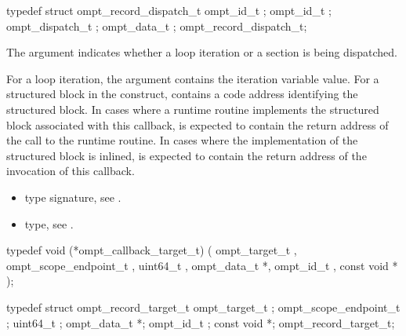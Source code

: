 \record

\begin{ccppspecific}
\begin{omptRecord}
typedef struct ompt_record_dispatch_t {
  ompt_id_t ;
  ompt_id_t ;
  ompt_dispatch_t ;
  ompt_data_t ; 
} ompt_record_dispatch_t;
\end{omptRecord}
\end{ccppspecific}


\argdesc

The argument  indicates whether a loop iteration or a
section is being dispatched.

For a loop iteration, the argument  contains
the iteration variable value.  
For a structured block in the  construct, 
contains a code address identifying the structured block.  In cases where a
runtime routine implements the structured block associated with this callback,
 is expected to contain the return address of the
call to the runtime routine.  In cases where the implementation of
the structured block is inlined,  is expected to contain
the return address of the invocation of this callback.

\crossreferences
\begin{itemize}
\item {} type signature, see
  .
\item {} type, see
  .
\end{itemize}



\label{sec:ompt_callback_target_t}
\format

\begin{ccppspecific}
\begin{omptCallback}
typedef void (*ompt_callback_target_t) (
  ompt_target_t ,
  ompt_scope_endpoint_t ,
  uint64_t ,
  ompt_data_t *,
  ompt_id_t ,
  const void *
);
\end{omptCallback}
\end{ccppspecific}


\record

\begin{ccppspecific}
\begin{omptRecord}
typedef struct ompt_record_target_t {
  ompt_target_t ;
  ompt_scope_endpoint_t ;
  uint64_t ;
  ompt_data_t *;
  ompt_id_t ;
  const void *;
} ompt_record_target_t;
\end{omptRecord}
\end{ccppspecific}


